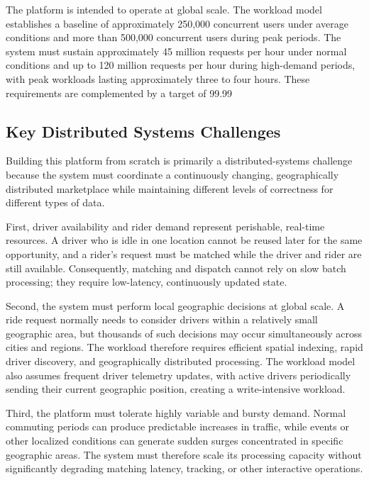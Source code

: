 The platform is intended to operate at global scale. The workload model establishes a baseline of approximately 250,000 concurrent users under average conditions and more than 500,000 concurrent users during peak periods. The system must sustain approximately 45 million requests per hour under normal conditions and up to 120 million requests per hour during high-demand periods, with peak workloads lasting approximately three to four hours. These requirements are complemented by a target of 99.99%


\subsection{Key Distributed Systems Challenges}

Building this platform from scratch is primarily a distributed-systems challenge because the system must coordinate a continuously changing, geographically distributed marketplace while maintaining different levels of correctness for different types of data.

First, driver availability and rider demand represent perishable, real-time resources. A driver who is idle in one location cannot be reused later for the same opportunity, and a rider's request must be matched while the driver and rider are still available. Consequently, matching and dispatch cannot rely on slow batch processing; they require low-latency, continuously updated state.

Second, the system must perform local geographic decisions at global scale. A ride request normally needs to consider drivers within a relatively small geographic area, but thousands of such decisions may occur simultaneously across cities and regions. The workload therefore requires efficient spatial indexing, rapid driver discovery, and geographically distributed processing. The workload model also assumes frequent driver telemetry updates, with active drivers periodically sending their current geographic position, creating a write-intensive workload.

Third, the platform must tolerate highly variable and bursty demand. Normal commuting periods can produce predictable increases in traffic, while events or other localized conditions can generate sudden surges concentrated in specific geographic areas. The system must therefore scale its processing capacity without significantly degrading matching latency, tracking, or other interactive operations.

